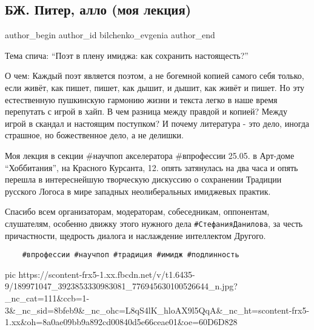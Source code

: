  
 
 
 
 
 
\subsection{БЖ. Питер, алло (моя лекция)}
\label{sec:25_05_2021.fb.bilchenko_evgenia.2.piter_allo_lekcia}
\ifcmt
 author_begin
   author_id bilchenko_evgenia
 author_end
\fi

Тема спича: \enquote{Поэт в плену имиджа: как сохранить настоящесть?}

О чем: Каждый поэт является поэтом, а не богемной копией самого себя только,
если живёт, как пишет, пишет, как дышит, и дышит, как живёт и пишет. Но эту
естественную пушкинскую гармонию жизни и текста легко в наше время перепутать с
игрой в хайп. В чем разница между правдой и копией? Между игрой в скандал и
настоящим поступком? И почему литература - это дело, иногда страшное, но
божественное дело, а не делишки.

Моя лекция в секции #научпоп акселератора #впрофессии 25.05. в Арт-доме
\enquote{Хоббитания}, на Красного Курсанта, 12. опять затянулась на два часа и опять
перешла в интереснейшую творческую дискуссию о сохранении Традиции русского
Логоса в мире западных неолиберальных имиджевых практик. 

Спасибо всем организаторам, модераторам, собеседникам, оппонентам, слушателям,
особенно движку этого нужного дела \verb|#СтефанияДанилова|, за честь
причастности, щедрость диалога и наслаждение интеллектом Другого. 

\begin{verbatim}
	#впрофессии #научпоп #традиция #имидж #подлинность
\end{verbatim}


\ifcmt

  pic https://scontent-frx5-1.xx.fbcdn.net/v/t1.6435-9/189971047_3923853330983081_776945630100526644_n.jpg?_nc_cat=111&ccb=1-3&_nc_sid=8bfeb9&_nc_ohc=L8qS4lK_hloAX9l5QqA&_nc_ht=scontent-frx5-1.xx&oh=8a0ae09bb9a892cd00840d5e66ceae01&oe=60D6D828

